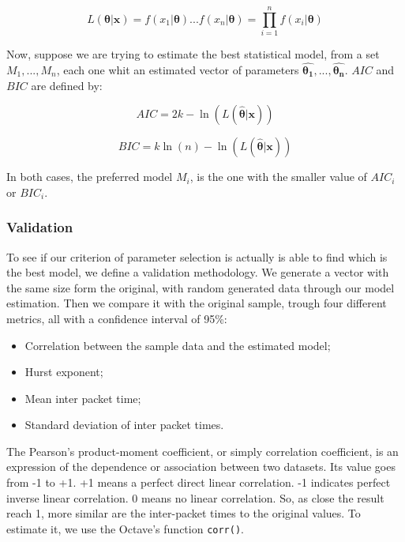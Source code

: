 \begin{equation}
L(\boldsymbol{\theta}|\boldsymbol{x} ) =  f(x_1|\boldsymbol{\theta})...f(x_n|\boldsymbol{\theta}) = \prod_{i = 1}^{n}f(x_i|\boldsymbol{\theta})
\end{equation}

Now, suppose we are trying to estimate the best statistical model, from a set ${M_1, ..., M_n}$, each one whit an estimated vector of parameters  ${\boldsymbol{\hat{\theta_1}}}, ..., {\boldsymbol{\hat{\theta_n}}}$. $AIC$ and $BIC$ are defined by:

\begin{equation}
AIC = 2k - \ln(L(\boldsymbol{\hat{\theta}}|\boldsymbol{x}))
\end{equation}

\begin{equation}
BIC = k\ln(n) - \ln(L(\boldsymbol{\hat{\theta}}|\boldsymbol{x}))
\end{equation}

In both cases, the preferred model $M_i$, is the one with the smaller value of $AIC_i$ or $BIC_i$.




\subsubsection{Validation}

To see if our criterion of parameter selection is actually is able to find which is the best model, we define a validation methodology. 
We generate a vector with the same size form the original, with random generated data through our model estimation. Then we compare it with the original sample, trough four different metrics, all with a confidence interval of 95\%:

\begin{itemize}
\item Correlation between the sample data and the estimated model;
\item Hurst exponent;
\item Mean inter packet time;
\item Standard deviation of inter packet times.
\end{itemize}

The Pearson's product-moment coefficient, or simply correlation coefficient,  is an expression of the dependence or association between two datasets. Its value goes from -1 to +1. +1 means a perfect direct linear correlation. -1 indicates perfect inverse linear correlation. 0 means no linear correlation. So, as close the result reach 1, more similar are the inter-packet times to the original values. To estimate it, we use the Octave's function \texttt{corr()}.

